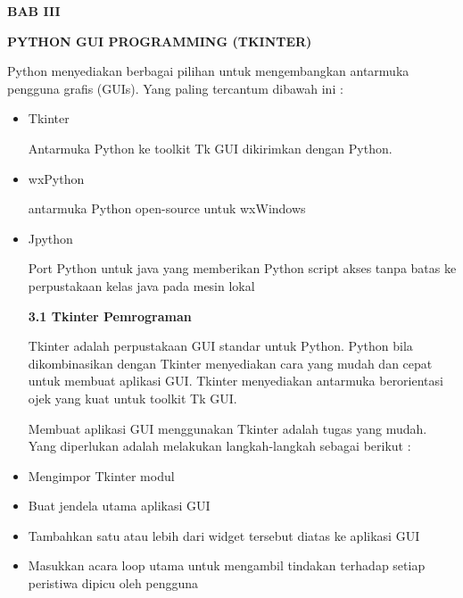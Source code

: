 \documentclass[a4paper,12pt]{report}
\begin{document}
\sloppy
\begin{center}{\fontsize{14pt}{14pt}\selectfont \textbf{BAB III} \\}\end{center} \par
\noindent 
\begin{center}{\fontsize{14pt}{14pt}\selectfont \textbf{PYTHON GUI PROGRAMMING (TKINTER)} \\}\end{center} \par
\vspace{12pt}
Python menyediakan berbagai pilihan untuk mengembangkan antarmuka pengguna grafis (GUIs). Yang paling tercantum dibawah ini : \par
\noindent 
\begin{itemize}
\item Tkinter \par
Antarmuka Python ke toolkit Tk GUI dikirimkan dengan Python.  \par
\noindent 
\item wxPython \par
antarmuka Python open-source untuk wxWindows \par
\noindent 
\item Jpython \par
Port Python untuk java yang memberikan Python script akses tanpa batas ke perpustakaan kelas java pada mesin lokal \par
\vspace{12pt}
\noindent 
\textbf{3.1 Tkinter Pemrograman} \par
Tkinter adalah perpustakaan GUI standar untuk Python. Python bila dikombinasikan dengan Tkinter menyediakan cara yang mudah dan cepat untuk membuat aplikasi GUI. Tkinter menyediakan antarmuka berorientasi ojek yang kuat untuk toolkit Tk GUI. \par
\noindent 
 \hspace*{0.5in} Membuat aplikasi GUI menggunakan Tkinter adalah tugas yang mudah. Yang diperlukan adalah melakukan langkah-langkah sebagai berikut : \par
\noindent 
\item Mengimpor Tkinter modul \par
\noindent 
\item Buat jendela utama aplikasi GUI \par
\noindent 
\item Tambahkan satu atau lebih dari widget tersebut diatas ke aplikasi GUI \par
\noindent 
\item Masukkan acara loop utama untuk mengambil tindakan terhadap setiap peristiwa dipicu oleh pengguna\end{itemize}
 \par
\noindent 
\end{document}
